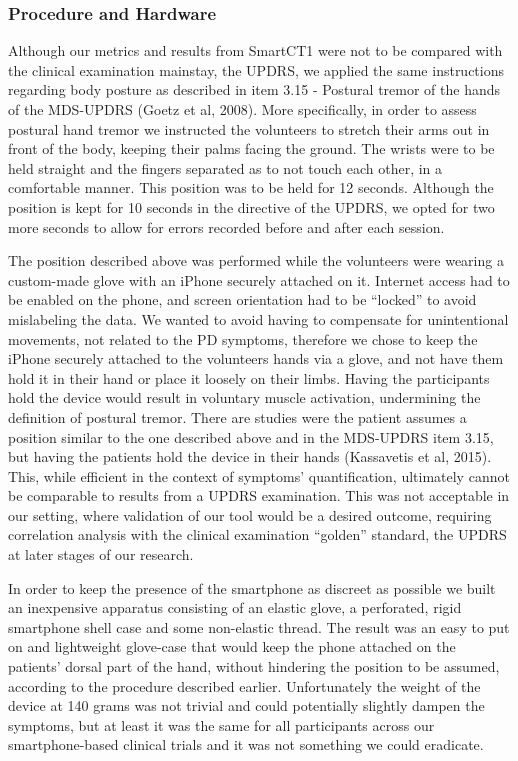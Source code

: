 \subsubsection{Procedure and Hardware}
\label{subsubsec:smartCT1ProcHardware}

Although our metrics and results from \gls{SmartCT1} were not to be compared with the clinical examination mainstay, the \gls{UPDRS}, we applied the same instructions regarding body posture as described in item 3.15 - Postural tremor of the hands of the \gls{MDS}-\gls{UPDRS} (Goetz et al, 2008). More specifically, in order to assess postural hand tremor we instructed the volunteers to stretch their arms out in front of the body, keeping their palms facing the ground. The wrists were to be held straight and the fingers separated as to not touch each other, in a comfortable manner. This position was to be held for 12 seconds. Although the position is kept for 10 seconds in the directive of the \gls{UPDRS}, we opted for two more seconds to allow for errors recorded before and after each session. 

The position described above was performed while the volunteers were wearing a custom-made glove with an iPhone securely attached on it. Internet access had to be enabled on the phone, and screen orientation had to be ``locked'' to avoid mislabeling the data. We wanted to avoid having to compensate for unintentional movements, not related to the \gls{PD} symptoms, therefore we chose to keep the iPhone securely attached to the volunteers hands via a glove, and not have them hold it in their hand or place it loosely on their limbs. Having the participants hold the device would result in voluntary muscle activation, undermining the definition of postural tremor. There are studies were the patient assumes a position similar to the one described above and in the \gls{MDS}-\gls{UPDRS} item 3.15, but having the patients hold the device in their hands (Kassavetis et al, 2015). This, while efficient in the context of symptoms' quantification, ultimately cannot be comparable to results from a \gls{UPDRS} examination. This was not acceptable in our setting, where validation of our tool would be a desired outcome, requiring correlation analysis with the clinical examination ``golden'' standard, the \gls{UPDRS} at later stages of our research. 

In order to keep the presence of the smartphone as discreet as possible we built an inexpensive apparatus consisting of an elastic glove, a perforated, rigid smartphone shell case and some non-elastic thread. The result was an easy to put on and lightweight glove-case that would keep the phone attached on the patients' dorsal part of the hand, without hindering the position to be assumed, according to the procedure described earlier. Unfortunately the weight of the device at 140 grams was not trivial and could potentially slightly dampen the symptoms, but at least it was the same for all participants across our smartphone-based clinical trials and it was not something we could eradicate. 

